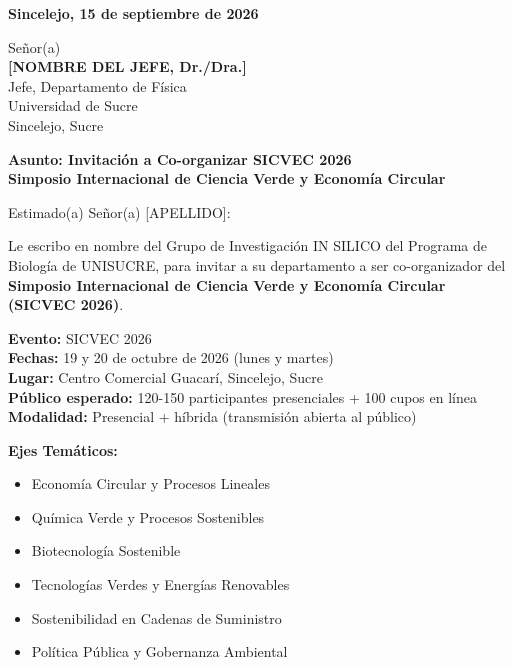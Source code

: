 \documentclass[12pt,a4paper]{article}
\begin{document}
\vspace{1cm}

\noindent
\textbf{Sincelejo, 15 de septiembre de 2026}

\vspace{1.5cm}

\noindent
Señor(a)\\
\textbf{[NOMBRE DEL JEFE, Dr./Dra.]}\\
Jefe, Departamento de Física\\
Universidad de Sucre\\
Sincelejo, Sucre

\vspace{1.5cm}

\noindent
\textbf{\large Asunto: Invitación a Co-organizar SICVEC 2026}\\
\textbf{\large Simposio Internacional de Ciencia Verde y Economía Circular}

\vspace{1.5cm}

Estimado(a) Señor(a) [APELLIDO]:

\vspace{0.8cm}

Le escribo en nombre del Grupo de Investigación IN SILICO del Programa de Biología de UNISUCRE, para invitar a su departamento a ser co-organizador del \textbf{Simposio Internacional de Ciencia Verde y Economía Circular (SICVEC 2026)}.

\vspace{0.8cm}

\textbf{Evento:} SICVEC 2026\\
\textbf{Fechas:} 19 y 20 de octubre de 2026 (lunes y martes)\\
\textbf{Lugar:} Centro Comercial Guacarí, Sincelejo, Sucre\\
\textbf{Público esperado:} 120-150 participantes presenciales + 100 cupos en línea\\
\textbf{Modalidad:} Presencial + híbrida (transmisión abierta al público)

\vspace{1cm}

\textbf{Ejes Temáticos:}
\begin{itemize}
  \item Economía Circular y Procesos Lineales
  \item Química Verde y Procesos Sostenibles
  \item Biotecnología Sostenible
  \item Tecnologías Verdes y Energías Renovables
  \item Sostenibilidad en Cadenas de Suministro
  \item Política Pública y Gobernanza Ambiental
\end{itemize}
\end{document}
